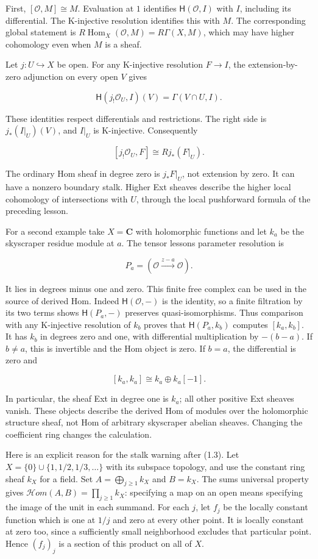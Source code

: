 \documentclass[
  english,
  11pt,
  a4paper,
]{article}
\begin{document}
First, \([\mathcal O,M]\cong M\). Evaluation at \(1\) identifies
\(\mathsf H(\mathcal O,I)\) with \(I\), including its differential. The
K-injective resolution identifies this with \(M\). The corresponding
global statement is
\(R\operatorname{Hom}_X(\mathcal O,M)=R\Gamma(X,M)\), which may have
higher cohomology even when \(M\) is a sheaf.

Let \(j:U\hookrightarrow X\) be open. For any K-injective resolution
\(F\to I\), the extension-by-zero adjunction on every open \(V\) gives

\[\mathsf H(j_!\mathcal O_U,I)(V)
=\Gamma(V\cap U,I).\]

These identities respect differentials and restrictions. The right side
is \(j_*(I|_U)(V)\), and \(I|_U\) is K-injective. Consequently

\[[j_!\mathcal O_U,F]\cong Rj_*(F|_U).
\tag{5.1}\]

The ordinary Hom sheaf in degree zero is \(j_*F|_U\), not extension by
zero. It can have a nonzero boundary stalk. Higher Ext sheaves describe
the higher local cohomology of intersections with \(U\), through the
local pushforward formula of the preceding lesson.

For a second example take \(X=\mathbf C\) with holomorphic functions and
let \(k_a\) be the skyscraper residue module at \(a\). The tensor
lesson\textquotesingle s parameter resolution is

\[P_a=(\mathcal O\xrightarrow{z-a}\mathcal O).
\tag{5.2}\]

It lies in degrees minus one and zero. This finite free complex can be
used in the source of derived Hom. Indeed \(\mathsf H(\mathcal O,-)\) is
the identity, so a finite filtration by its two terms shows
\(\mathsf H(P_a,-)\) preserves quasi-isomorphisms. Thus comparison with
any K-injective resolution of \(k_b\) proves that \(\mathsf H(P_a,k_b)\)
computes \([k_a,k_b]\). It has \(k_b\) in degrees zero and one, with
differential multiplication by \(-(b-a)\). If \(b\ne a\), this is
invertible and the Hom object is zero. If \(b=a\), the differential is
zero and

\[[k_a,k_a]\cong k_a\oplus k_a[-1].
\tag{5.3}\]

In particular, the sheaf Ext in degree one is \(k_a\); all other
positive Ext sheaves vanish. These objects describe the derived Hom of
modules over the holomorphic structure sheaf, not Hom of arbitrary
skyscraper abelian sheaves. Changing the coefficient ring changes the
calculation.

Here is an explicit reason for the stalk warning after (1.3). Let
\(X=\{0\}\cup\{1,1/2,1/3,\ldots\}\) with its subspace topology, and use
the constant ring sheaf \(k_X\) for a field. Set
\(A=\bigoplus_{j\geq1}k_X\) and \(B=k_X\). The sum\textquotesingle s
universal property gives \(\mathcal Hom(A,B)=\prod_{j\geq1}k_X\):
specifying a map on an open means specifying the image of the unit in
each summand. For each \(j\), let \(f_j\) be the locally constant
function which is one at \(1/j\) and zero at every other point. It is
locally constant at zero too, since a sufficiently small neighborhood
excludes that particular point. Hence \((f_j)_j\) is a section of this
product on all of \(X\).
\end{document}
